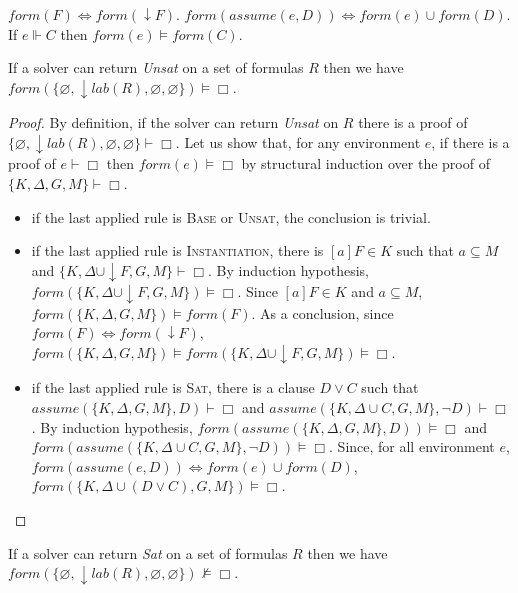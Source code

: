 \documentclass[a4paper,11pt]{article}
\newcommand{\F}{\mathit{form}}
\newcommand{\T}{\mathit{lab}}
\newcommand{\A}{\mathit{assume}}
\begin{document}
{\lemma $\F(F)\Leftrightarrow\F(\downarrow F)$.}
{\lemma $\F(\A(e,D))\Leftrightarrow\F(e)\cup\F(D)$.}
{\lemma If $e\Vdash C$ then $\F(e)\vDash\F(C)$.}

{\theorem\label{pred1} If a solver can return \emph{Unsat} on a set of formulas $R$ then we have
$\F(\{\varnothing,\downarrow\T(R),\varnothing,\varnothing\})\vDash\Box$.}
\begin{proof}
By definition, if the solver can return \emph{Unsat} on $R$ there is a proof of
$\{\varnothing,\downarrow\T(R),\varnothing,\varnothing\}\vdash\Box$. Let us show that,
for any environment $e$, if there is a proof of $e\vdash\Box$ then $\F(e)\vDash\Box$ by structural
induction over the proof of $\{K,\Delta,G,M\}\vdash\Box$.
\begin{itemize}
 \item if the last applied rule is \textsc{Base} or \textsc{Unsat}, the conclusion is trivial.
 \item if the last applied rule is \textsc{Instantiation}, there is $[a]F\in K$ such that
$a\subseteq M$ and $\{K,\Delta\cup\downarrow F,G,M\}\vdash\Box$. By induction hypothesis,
$\F(\{K,\Delta\cup\downarrow F,G,M\})\vDash\Box$. Since $[a]F\in K$ and $a\subseteq M$,
$\F(\{K,\Delta,G,M\})\vDash\F(F)$. As a conclusion, since $\F(F)\Leftrightarrow\F(\downarrow F)$,
$\F(\{K,\Delta,G,M\})\vDash\F(\{K,\Delta\cup\downarrow F,G,M\})\vDash\Box$.
 \item if the last applied rule is \textsc{Sat}, there is a clause $D\vee C$ such that
$\A(\{K,\Delta,G,M\},D)\vdash\Box$ and $\A(\{K,\Delta\cup C,G,M\},\neg D)\vdash\Box$.
By induction hypothesis, $\F(\A(\{K,\Delta,G,M\},D))\vDash\Box$ and
$\F(\A(\{K,\Delta\cup C,G,M\},\neg D))\vDash\Box$. Since, for all environment $e$,
$\F(\A(e,D))\Leftrightarrow\F(e)\cup\F(D)$,
$\F(\{K,\Delta\cup(D\vee C),G,M\})\vDash\Box$.
\end{itemize}
\end{proof}
{\theorem\label{pred2} If a solver can return \emph{Sat} on a set of formulas $R$ then we have
$\F(\{\varnothing,\downarrow\T(R),\varnothing,\varnothing\})\nvDash\Box$.}
\end{document}
